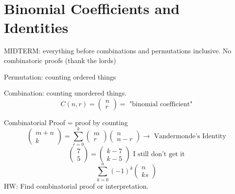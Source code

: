 \documentclass{report}
\begin{document}
\chapter{Binomial Coefficients and Identities}
MIDTERM: everything before combinations and permutations inclusive. No combinatoric proofs (thank the lords)


Permutation: counting ordered things

Combination: counting unordered things. 
\[
C(n, r) = \begin{pmatrix} n \\ r \end{pmatrix} =  \textrm{ "binomial coefficient"}
\]

Combinatorial Proof = proof by counting
\[
\begin{pmatrix}
m+n \\ k
\end{pmatrix}
=
\sum^k_{r=0} \begin{pmatrix}
m \\ r \end{pmatrix}
\begin{pmatrix}
n \\ n-r 
\end{pmatrix}
\rightarrow
\textrm{ Vandermonde's Identity}
\]
\[
\begin{pmatrix} 7 \\ 5 \end{pmatrix}
=
\begin{pmatrix} k-7 \\ k-5 \end{pmatrix}
\textrm{ I still don't get it}
\]
\[
\sum^n_{k=0}(-1)^k \begin{pmatrix} n \\ ks \end{pmatrix}
\]
HW: Find combinatorial proof or interpretation.
\end{document}
